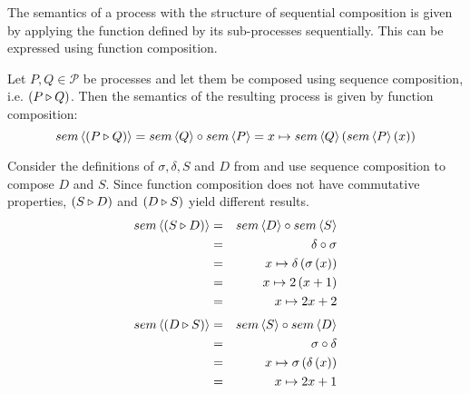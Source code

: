 The semantics of a process with the structure of sequential composition is given by applying the function defined by its sub-processes sequentially. This can be expressed using function composition.
\begin{definition}
\label{def:sem_sequence}
Let $P, Q \in \mathcal{P}$ be processes and let them be composed using sequence composition, i.e. $\left( P \triangleright Q \right)$. Then the semantics of the resulting process is given by function composition:
  \begin{equation*}
    \label{eqn:sem_sequence}
    sem \left\langle \left( P \triangleright Q \right) \right\rangle = sem \left\langle Q \right\rangle \circ sem \left\langle P \right\rangle = x \mapsto sem \left\langle Q \right\rangle \left( sem \left\langle P \right\rangle \left( x \right) \right)
  \end{equation*}
  \hfill\qedsymbol
\end{definition}


\begin{example}
\label{exp:sem_sequence}
Consider the definitions of $\sigma, \delta, S$ and $D$ from  and use sequence composition to compose $D$ and $S$. Since function composition does not have commutative properties, $\left( S \triangleright D \right)$ and $\left( D \triangleright S \right)$ yield different results.
  \begin{eqnarray*}
    sem \left\langle \left( S \triangleright D \right) \right\rangle & = & sem \left\langle D \right\rangle \circ sem \left\langle S \right\rangle \\
                          & = & \delta \circ \sigma \\
                          & = & x \mapsto \delta \left( \sigma \left( x \right) \right) \\
                          & = & x \mapsto 2 \left( x+1 \right) \\
                          & = & x \mapsto 2x+2
  \end{eqnarray*}
  \begin{eqnarray*}
    sem \left\langle \left( D \triangleright S \right) \right\rangle & = & sem \left\langle S \right\rangle \circ sem \left\langle D \right\rangle \\
                          & = & \sigma \circ \delta \\
                          & = & x \mapsto \sigma \left( \delta \left( x \right) \right) \\
                          & = & x \mapsto 2x + 1
  \end{eqnarray*}
\end{example}


